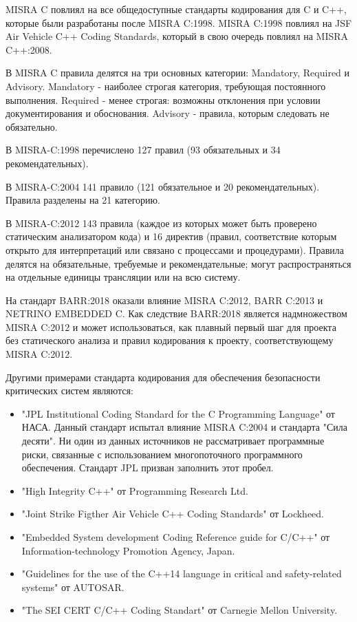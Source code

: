 MISRA C повлиял на все общедоступные стандарты кодирования для C и C++, которые были разработаны после MISRA 
C:1998. MISRA C:1998 повлиял на JSF Air Vehicle C++ Coding Standards\cite{JSF}, который в свою очередь повлиял на MISRA C++:2008.

В MISRA C правила делятся на три основных категории: Mandatory, Required и Advisory. Mandatory -
наиболее строгая категория, требующая постоянного выполнения. Required - менее строгая: возможны 
отклонения при условии документирования и обоснования. Advisory - правила, которым следовать 
не обязательно.

В MISRA-C:1998 перечислено 127 правил (93 обязательных и 34 рекомендательных).

В MISRA-C:2004 141 правило (121 обязательное и 20 рекомендательных). Правила разделены на 21 категорию.

В MISRA-C:2012 143 правила (каждое из которых может быть проверено статическим анализатором кода) и 16 директив 
(правил, соответствие которым открыто для интерпретаций или связано с процессами и процедурами). Правила делятся 
на обязательные, требуемые и рекомендательные; могут распространяться на отдельные единицы трансляции или на всю 
систему.

На стандарт BARR:2018 оказали влияние MISRA C:2012, BARR C:2013 и NETRINO EMBEDDED C. Как следствие BARR:2018 является 
надмножеством MISRA C:2012 и может использоваться, как плавный первый шаг для проекта без статического анализа и правил кодирования 
к проекту, соответствующему MISRA C:2012.

Другими примерами стандарта кодирования для обеспечения безопасности критических систем являются:
\begin{itemize}
    \item "JPL Institutional Coding Standard for the C Programming Language"\cite{JPL} от НАСА. Данный стандарт испытал влияние MISRA C:2004 и 
        стандарта "Сила десяти"\cite{powerOfTen}. Ни один из данных источников не рассматривает программные риски, связанные с использованием 
        многопоточного программного обеспечения. Стандарт JPL  призван заполнить этот пробел.
    \item "High Integrity C++"\cite{highIntegrity} от Programming Research Ltd. 
    \item "Joint Strike Figther Air Vehicle C++ Coding Standards"\cite{JSF} от Lockheed.
    \item "Embedded System development Coding Reference guide for C/C++"\cite{escrC, escrCPP} от Information-technology Promotion Agency, Japan.
    \item "Guidelines for the use of the C++14 language in critical and safety-related systems"\cite{autosar} от AUTOSAR.
    \item "The SEI CERT C/C++ Coding Standart" от Carnegie Mellon University\cite{CERT}. 
\end{itemize}

